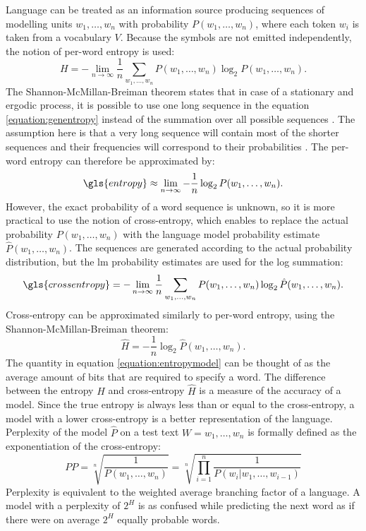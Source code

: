 	Language can be treated as an information source producing sequences of modelling units $w_{1}, \dots, w_{n}$ with probability $P(w_{1}, \dots, w_{n})$, where each token $w_{i}$ is taken from a vocabulary $V$. Because the symbols are not emitted independently, the notion of per-word entropy is used:
	\begin{equation}
		H=-\lim_{n\to\infty}\frac{1}{n}\sum_{w_{1}, \dots, w_{n}}P(w_{1}, \dots, w_{n})\log_{2}P(w_{1}, \dots, w_{n}).
		\label{equation:genentropy}
	\end{equation}
	The Shannon-McMillan-Breiman theorem states that in case of a stationary and ergodic process, it is possible to use one long sequence in the equation \ref{equation:genentropy} instead of the summation over all possible sequences \cite{algoet1988sandwich}. The assumption here is that a very long sequence will contain most of the shorter sequences and their frequencies will correspond to their probabilities \cite{jurafsky2000speech}. The per-word entropy can therefore be approximated by:
	\begin{equation}
		\gls{entropy}\approx\lim_{n\to\infty}-\frac{1}{n}\log_{2}P(w_{1}, \dots, w_{n}).
		\label{equation:approxentropy}
	\end{equation}
	However, the exact probability of a word sequence is unknown, so it is more practical to use the notion of cross-entropy, which enables to replace the actual probability $P(w_{1}, \dots, w_{n})$ with the language model probability estimate $\hat{P}(w_{1}, \dots, w_{n})$. The sequences are generated according to the actual probability distribution, but the \gls{lm} probability estimates are used for the log summation:
	\begin{equation}
		\gls{crossentropy}=-\lim_{n\to\infty}\frac{1}{n}\sum_{w_{1}, \dots, w_{n}}P(w_{1}, \dots, w_{n})\log_{2}\hat{P}(w_{1}, \dots, w_{n}).
		\label{equation:crossentropy}
	\end{equation}
	\mbox{Cross-entropy} can be approximated similarly to \mbox{per-word} entropy, using the Shannon-McMillan-Breiman theorem:
	\begin{equation}
		\hat{H}=-\frac{1}{n}\log_{2}\hat{P}(w_{1}, \dots, w_{n}).
		\label{equation:entropymodel}
	\end{equation}
	The quantity in equation \ref{equation:entropymodel} can be thought of as the average amount of bits that are required to specify a word. The difference between the entropy $H$ and cross-entropy $\hat{H}$ is a measure of the accuracy of a model. Since the true entropy is always less than or equal to the cross-entropy, a model with a lower cross-entropy is a better representation of the language. Perplexity of the model $\hat{P}$ on a test text $W=w_{1}, \dots, w_{n}$ is formally defined as the exponentiation of the cross-entropy:
	\begin{equation}
		PP=\sqrt[n]{\frac{1}{P(w_{1}, \dots, w_{n})}}=\sqrt[n]{\prod_{i=1}^{n}\frac{1}{P(w_{i}|w_{1}, \dots, w_{i-1})}}
		\label{equation:perplexity}
	\end{equation}
	Perplexity is equivalent to the weighted average branching factor of a language. A model with a perplexity of $2^{H}$ is as confused while predicting the next word as if there were on average $2^{H}$ equally probable words.


